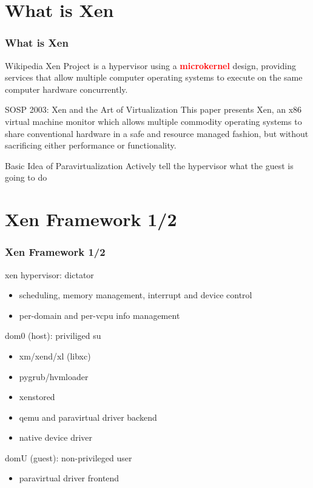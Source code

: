 \documentclass[aspectratio=169]{beamer}
\begin{document}

\section {What is Xen}
\begin{frame}
\frametitle{What is Xen}
\begin{block}{Wikipedia}
Xen Project is a hypervisor using a \textbf{\textcolor{red}{microkernel}} design, providing services that allow multiple computer operating systems to execute on the same computer hardware concurrently.
\end{block} \pause
\begin{block}{SOSP 2003: Xen and the Art of Virtualization}
This paper presents Xen, an x86 virtual machine monitor which allows multiple commodity operating systems to share conventional hardware in a safe and resource managed fashion, but without sacrificing either performance or functionality. \pause
\end{block}
\begin{block}{Basic Idea of Paravirtualization}
Actively tell the hypervisor what the guest is going to do
\end{block}
\end{frame}


\section{Xen Framework 1/2}
\begin{frame}
\frametitle{Xen Framework 1/2}
\begin{block}{xen hypervisor: dictator}
\begin{itemize}
\item scheduling, memory management, interrupt and device control
\item per-domain and per-vcpu info management
\end{itemize}
\end{block} \pause
\begin{block}{dom0 (host): priviliged su}
\begin{itemize}
\item xm/xend/xl (libxc)
\item pygrub/hvmloader
\item xenstored
\item qemu and paravirtual driver backend
\item native device driver
\end{itemize}
\end{block} \pause
\begin{block}{domU (guest): non-privileged user}
\begin{itemize}
\item paravirtual driver frontend
\end{itemize}
\end{block}
\end{frame}
\end{document}
